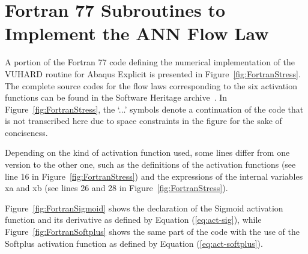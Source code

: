 \documentclass[algorithms,article,accept,pdftex,oneauthor]{Definitions/mdpi}
\DeclareRobustCommand{\var}[1]{\textsf{#1}}
\begin{document}
\section[\appendixname~\thesection]{Fortran 77 Subroutines to Implement the ANN Flow Law\label{sec:Appendix2}}

A portion of the Fortran 77 code defining the numerical implementation of the VUHARD routine for Abaqus Explicit is presented in Figure~\ref{fig:FortranStress}.
The complete source codes for the flow laws corresponding to the six activation functions can be found in the Software Heritage archive~\cite{Pantale-2023-SSF}.
In Figure~\ref{fig:FortranStress}, the `...' symbols denote a continuation of the code that is not transcribed here due to space constraints in the figure for the sake of conciseness.

Depending on the kind of activation function used, some lines differ from one version to the other one, such as the definitions of the activation functions (see line 16 in Figure~\ref{fig:FortranStress}) and the expressions of the internal variables \var{xa} and \var{xb} (see lines 26 and 28 in Figure~\ref{fig:FortranStress}).

Figure~\ref{fig:FortranSigmoid} shows the declaration of the Sigmoid activation function and its derivative as defined by Equation (\ref{eq:act-sig}), while Figure~\ref{fig:FortranSoftplus} shows the same part of the code with the use of the Softplus activation function as defined by Equation (\ref{eq:act-softplus}).
\end{document}
